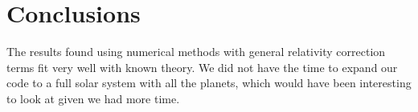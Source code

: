 \documentclass[a4paper, fontsize=11pt]{article}
\begin{document}
\section{Conclusions}

The results found using numerical methods with general relativity correction terms fit very well with known theory. We did not have the time to expand our code to a full solar system with all the planets, which would have been interesting to look at given we had more time.




\end{document}
